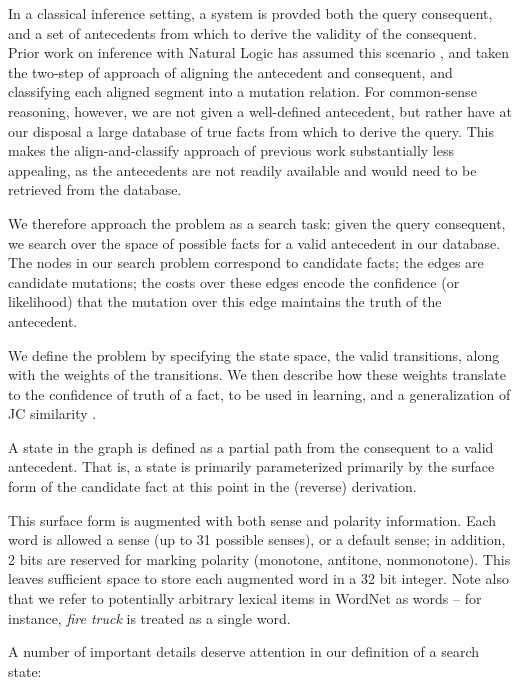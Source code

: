 In a classical inference setting, a system is provded both the
  query consequent, and a set of antecedents from which to derive
  the validity of the consequent.
Prior work on inference with Natural Logic has assumed this scenario
  \cite{key:2008maccartney-natlog}, and taken the two-step of approach
  of aligning the antecedent and consequent, and classifying each
  aligned segment into a mutation relation.
For common-sense reasoning, however, we are not given a well-defined
  antecedent, but rather have at our disposal a large database of
  true facts from which to derive the query.
This makes the align-and-classify approach of previous work substantially
  less appealing, as the antecedents are not readily available and would
  need to be retrieved from the database.

We therefore approach the problem as a search task: given the
  query consequent, we search over the space of possible facts for
  a valid antecedent in our database.
The nodes in our search problem correspond to candidate facts; the
  edges are candidate mutations; the costs over these edges encode
  the confidence (or likelihood) that the mutation over this edge
  maintains the truth of the antecedent.

We define the problem by specifying the state space,
  the valid transitions, along with the weights of
  the transitions.
We then describe how these weights translate to the confidence of truth
  of a fact, to be used in learning, and a generalization of
  JC similarity \cite{key:1997jc-similarity}.

%
%
A state in the graph is defined as a partial path from the consequent to a
  valid antecedent.
That is, a state is primarily parameterized primarily by the surface
  form of the candidate fact at this point in the (reverse) derivation.

This surface form is augmented with both sense and polarity
  information.
Each word is allowed a sense (up to 31 possible senses), or a default
  sense; in addition, 2 bits are reserved for marking polarity
  (monotone, antitone, nonmonotone).
This leaves sufficient space to store each augmented word in a 32 bit
  integer.
Note also that we refer to potentially arbitrary lexical items in
  WordNet as words -- for instance, \textit{fire truck} is treated as
  a single word.

A number of important details deserve attention in our definition of
  a search state:

